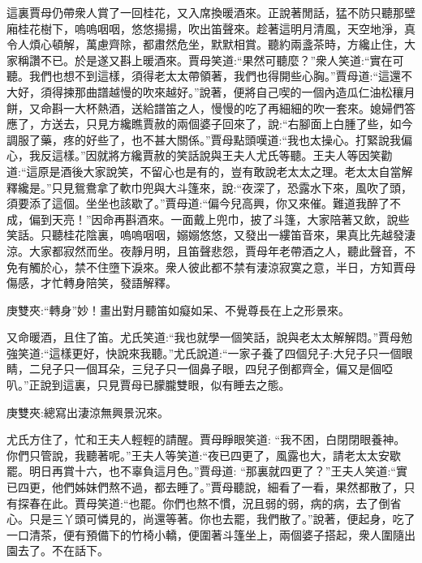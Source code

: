 \begin{parag}
    這裏賈母仍帶衆人賞了一回桂花，又入席換暖酒來。正說著閒話，猛不防只聽那壁廂桂花樹下，嗚嗚咽咽，悠悠揚揚，吹出笛聲來。趁著這明月清風，天空地淨，真令人煩心頓解，萬慮齊除，都肅然危坐，默默相賞。聽約兩盞茶時，方纔止住，大家稱讚不已。於是遂又斟上暖酒來。賈母笑道:“果然可聽麼？”衆人笑道:“實在可聽。我們也想不到這樣，須得老太太帶領著，我們也得開些心胸。”賈母道:“這還不大好，須得揀那曲譜越慢的吹來越好。”說著，便將自己喫的一個內造瓜仁油松穰月餅，又命斟一大杯熱酒，送給譜笛之人，慢慢的吃了再細細的吹一套來。媳婦們答應了，方送去，只見方纔瞧賈赦的兩個婆子回來了，說:“右腳面上白腫了些，如今調服了藥，疼的好些了，也不甚大關係。”賈母點頭嘆道:“我也太操心。打緊說我偏心，我反這樣。”因就將方纔賈赦的笑話說與王夫人尤氏等聽。王夫人等因笑勸道:“這原是酒後大家說笑，不留心也是有的，豈有敢說老太太之理。老太太自當解釋纔是。”只見鴛鴦拿了軟巾兜與大斗篷來，說:“夜深了，恐露水下來，風吹了頭，須要添了這個。坐坐也該歇了。”賈母道:“偏今兒高興，你又來催。難道我醉了不成，偏到天亮！”因命再斟酒來。一面戴上兜巾，披了斗篷，大家陪著又飲，說些笑話。只聽桂花陰裏，嗚嗚咽咽，嫋嫋悠悠，又發出一縷笛音來，果真比先越發淒涼。大家都寂然而坐。夜靜月明，且笛聲悲怨，賈母年老帶酒之人，聽此聲音，不免有觸於心，禁不住墮下淚來。衆人彼此都不禁有淒涼寂寞之意，半日，方知賈母傷感，才忙轉身陪笑，發語解釋。\begin{note}庚雙夾:“轉身”妙！畫出對月聽笛如癡如呆、不覺尊長在上之形景來。\end{note}又命暖酒，且住了笛。尤氏笑道:“我也就學一個笑話，說與老太太解解悶。”賈母勉強笑道:“這樣更好，快說來我聽。”尤氏說道:“一家子養了四個兒子:大兒子只一個眼睛，二兒子只一個耳朵，三兒子只一個鼻子眼，四兒子倒都齊全，偏又是個啞叭。”正說到這裏，只見賈母已朦朧雙眼，似有睡去之態。\begin{note}庚雙夾:總寫出淒涼無興景況來。\end{note}尤氏方住了，忙和王夫人輕輕的請醒。賈母睜眼笑道: “我不困，白閉閉眼養神。你們只管說，我聽著呢。”王夫人等笑道:“夜已四更了，風露也大，請老太太安歇罷。明日再賞十六，也不辜負這月色。”賈母道: “那裏就四更了？”王夫人笑道:“實已四更，他們姊妹們熬不過，都去睡了。”賈母聽說，細看了一看，果然都散了，只有探春在此。賈母笑道:“也罷。你們也熬不慣，況且弱的弱，病的病，去了倒省心。只是三丫頭可憐見的，尚還等著。你也去罷，我們散了。”說著，便起身，吃了一口清茶，便有預備下的竹椅小轎，便圍著斗篷坐上，兩個婆子搭起，衆人圍隨出園去了。不在話下。
\end{parag}


